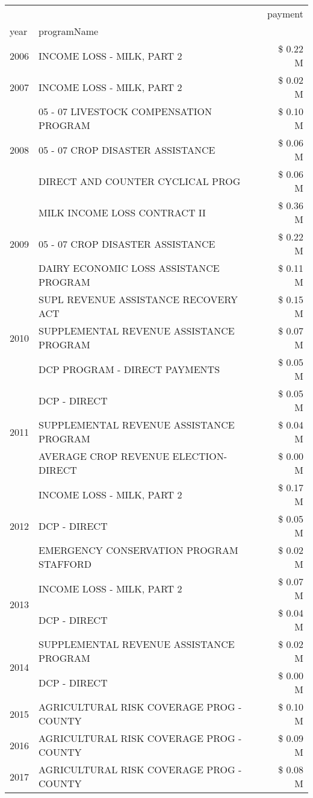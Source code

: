 \begin{tabular}{llr}
\toprule
 &  & payment \\
year & programName &  \\
\midrule
2006 & INCOME LOSS - MILK, PART 2 & \$ 0.22 M \\
\cline{1-3}
2007 & INCOME LOSS - MILK, PART 2 & \$ 0.02 M \\
\cline{1-3}
\multirow[t]{3}{*}{2008} & 05 - 07 LIVESTOCK COMPENSATION PROGRAM & \$ 0.10 M \\
 & 05 - 07 CROP DISASTER ASSISTANCE & \$ 0.06 M \\
 & DIRECT AND COUNTER CYCLICAL PROG & \$ 0.06 M \\
\cline{1-3}
\multirow[t]{3}{*}{2009} & MILK INCOME LOSS CONTRACT II & \$ 0.36 M \\
 & 05 - 07 CROP DISASTER ASSISTANCE & \$ 0.22 M \\
 & DAIRY ECONOMIC LOSS ASSISTANCE PROGRAM & \$ 0.11 M \\
\cline{1-3}
\multirow[t]{3}{*}{2010} & SUPL REVENUE ASSISTANCE RECOVERY ACT & \$ 0.15 M \\
 & SUPPLEMENTAL REVENUE ASSISTANCE PROGRAM & \$ 0.07 M \\
 & DCP PROGRAM - DIRECT PAYMENTS & \$ 0.05 M \\
\cline{1-3}
\multirow[t]{3}{*}{2011} & DCP - DIRECT & \$ 0.05 M \\
 & SUPPLEMENTAL REVENUE ASSISTANCE PROGRAM & \$ 0.04 M \\
 & AVERAGE CROP REVENUE ELECTION-DIRECT & \$ 0.00 M \\
\cline{1-3}
\multirow[t]{3}{*}{2012} & INCOME LOSS - MILK, PART 2 & \$ 0.17 M \\
 & DCP - DIRECT & \$ 0.05 M \\
 & EMERGENCY CONSERVATION PROGRAM STAFFORD & \$ 0.02 M \\
\cline{1-3}
\multirow[t]{2}{*}{2013} & INCOME LOSS - MILK, PART 2 & \$ 0.07 M \\
 & DCP - DIRECT & \$ 0.04 M \\
\cline{1-3}
\multirow[t]{2}{*}{2014} & SUPPLEMENTAL REVENUE ASSISTANCE PROGRAM & \$ 0.02 M \\
 & DCP - DIRECT & \$ 0.00 M \\
\cline{1-3}
2015 & AGRICULTURAL RISK COVERAGE PROG - COUNTY & \$ 0.10 M \\
\cline{1-3}
2016 & AGRICULTURAL RISK COVERAGE PROG - COUNTY & \$ 0.09 M \\
\cline{1-3}
\multirow[t]{2}{*}{2017} & AGRICULTURAL RISK COVERAGE PROG - COUNTY & \$ 0.08 M \\

\end{tabular}
